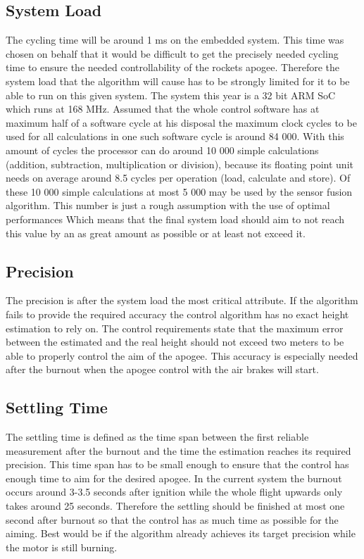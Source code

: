  \subsection{System Load}
 The cycling time will be around 1 ms on the embedded system. This time was chosen on behalf that it would be difficult to get the precisely needed cycling time to ensure the needed controllability of the rockets apogee.
 Therefore the system load that the algorithm will cause has to be strongly limited for it to be able to run on this given system.
 The system this year is a 32 bit ARM SoC which runs at 168 MHz. Assumed that the whole control software has at maximum half of a software cycle at his disposal the maximum clock cycles to be used for all calculations in one such software cycle is around 84 000.
 With this amount of cycles the processor can do around 10 000 simple calculations (addition, subtraction, multiplication or division),
 because its floating point unit needs on average around 8.5 cycles per operation (load, calculate and store). Of these 10 000 simple calculations at most 5 000 may be used by the sensor fusion algorithm.
 This number is just a rough assumption with the use of optimal performances
 Which means that the final system load should aim to not reach this value by an as great amount as possible or at least not exceed it.

 \subsection{Precision}
 The precision is after the system load the most critical attribute. If the algorithm fails to provide the required accuracy the control algorithm has no exact height estimation to rely on.
 The control requirements state that the maximum error between the estimated and the real height should not exceed two meters to be able to properly control the aim of the apogee.
 This accuracy is especially needed after the burnout when the apogee control with the air brakes will start.

 \subsection{Settling Time}
 The settling time is defined as the time span between the first reliable measurement after the burnout and the time  the estimation reaches its required precision.
 This time span has to be small enough to ensure that the control has enough time to aim for the desired apogee. In the current system the burnout occurs around 3-3.5 seconds after ignition while the whole flight upwards only takes around 25 seconds. Therefore the settling should be finished at most
 one second after burnout so that the control has as much time as possible for the aiming. Best would be if the algorithm already achieves its target precision while the motor is still burning.

